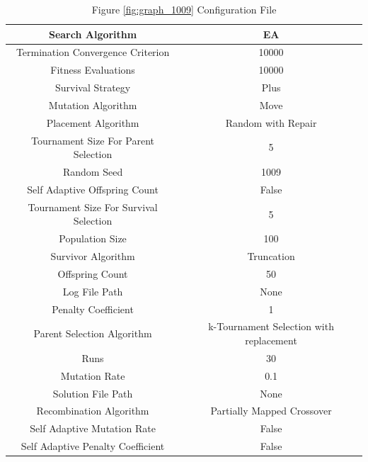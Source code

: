 \documentclass{standalone}
\begin{document}
\begin{table}[!htb]
	\centering
	\caption{Figure \ref{fig:graph_1009} Configuration File}
	\label{tab:graph_1009}
	\begin{tabular}{| c | c |}
		\hline
		Search Algorithm		& EA		 \\
		\hline
		Termination Convergence Criterion		& 10000		 \\
		\hline
		Fitness Evaluations		& 10000		 \\
		\hline
		Survival Strategy		& Plus		 \\
		\hline
		Mutation Algorithm		& Move		 \\
		\hline
		Placement Algorithm		& Random with Repair		 \\
		\hline
		Tournament Size For Parent Selection		& 5		 \\
		\hline
		Random Seed		& 1009		 \\
		\hline
		Self Adaptive Offspring Count		& False		 \\
		\hline
		Tournament Size For Survival Selection		& 5		 \\
		\hline
		Population Size		& 100		 \\
		\hline
		Survivor Algorithm		& Truncation		 \\
		\hline
		Offspring Count		& 50		 \\
		\hline
		Log File Path		& None		 \\
		\hline
		Penalty Coefficient		& 1		 \\
		\hline
		Parent Selection Algorithm		& k-Tournament Selection with replacement		 \\
		\hline
		Runs		& 30		 \\
		\hline
		Mutation Rate		& 0.1		 \\
		\hline
		Solution File Path		& None		 \\
		\hline
		Recombination Algorithm		& Partially Mapped Crossover		 \\
		\hline
		Self Adaptive Mutation Rate		& False		 \\
		\hline
		Self Adaptive Penalty Coefficient		& False		 \\
		\hline
	\end{tabular}
\end{table}
\end{document}
